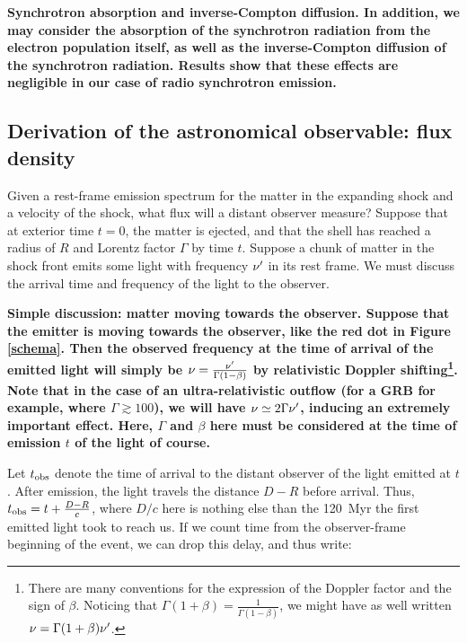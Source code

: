 \bf{Synchrotron absorption and inverse-Compton diffusion.} In addition, we may consider the absorption of the synchrotron radiation from the electron population itself, as well as the inverse-Compton diffusion of the synchrotron radiation. Results show  \citep[see e.g][]{1} that these effects are negligible in our case of radio synchrotron emission.

\subsection{Derivation of the astronomical observable: flux density}

Given a rest-frame emission spectrum for the matter in the expanding shock and a velocity of the shock, what flux will a distant observer measure? Suppose that at exterior time $t = 0$, the matter is ejected, and that the shell has reached a radius of $R$ and Lorentz factor $\Gamma$ by time $t$. Suppose a chunk of matter in the shock front emits some light with frequency $\nu^{\prime}$ in its rest frame. We must discuss the arrival time and frequency of the light to the observer.


\bf{Simple discussion: matter moving towards the observer. }Suppose that the emitter is moving towards the observer, like the red dot in Figure \ref{schema}. Then the observed frequency at the time of arrival of the emitted light will simply be $\nu = \frac{\nu^{\prime}}{\Gamma(1 - \beta)}$ by relativistic Doppler shifting\footnote{There are many conventions for the expression of the Doppler factor and the sign of $\beta$. Noticing that $\Gamma(1 + \beta) = \frac{1}{\Gamma(1 - \beta)}$, we might have as well written $\nu = \Gamma (1 + \beta) \nu^{\prime}$.}. Note that in the case of an ultra-relativistic outflow (for a GRB for example, where $\Gamma \gtrsim 100$), we will have $\nu \simeq 2 \Gamma \nu^{\prime}$, inducing an extremely important effect. Here, $\Gamma$ and $\beta$ here must be considered at the time of emission $t$ of the light of course.

Let $t_{\mathrm{obs}}$ denote the time of arrival to the distant observer of the light emitted at $t$. After emission, the light travels the distance $D - R$ before arrival. Thus, $t_{\mathrm{obs}} = t + \frac{D - R}{c}$, where $D/c$ here is nothing else than the 120~Myr the first emitted light took to reach us. If we count time from the observer-frame beginning of the event, we can drop this delay, and thus write:

